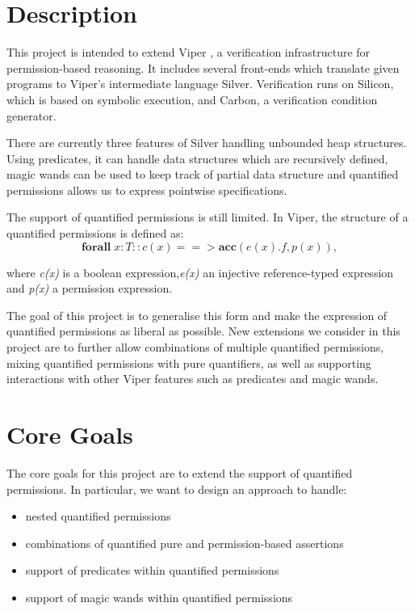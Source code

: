 \documentclass[12pt]{article}
\begin{document}
\maketitle

\section{Description}
This project is intended to extend Viper \cite{viper}, a verification infrastructure for permission-based reasoning. It includes several front-ends which translate given programs to Viper's intermediate language Silver. Verification runs on Silicon, which is based on symbolic execution, and Carbon, a verification condition generator.

There are currently three features of Silver handling unbounded heap structures. Using predicates, it can handle data structures which are recursively defined, magic wands \cite{magicwand} can be used to keep track of partial data structure and quantified permissions \cite{isc} allows us to express pointwise specifications. 

The support of quantified permissions is still limited. In Viper, the structure of a quantified permissions is defined as:
\newline 
\begin{equation}
	\mathbf{forall} \; x:T :: c(x) ==>\mathbf{acc}( e(x).f, p(x) ) ,
\end{equation}

where {\it c(x)} is  a boolean expression,{\it e(x)} an injective reference-typed expression and {\it p(x)} a permission expression.

The goal of this project is to generalise this form and make the expression of quantified permissions as liberal as possible. New extensions we consider in this project are to further allow combinations of multiple quantified permissions, mixing quantified permissions with pure quantifiers, as well as supporting interactions with other Viper features such as predicates and magic wands.

\section{Core Goals}
The core goals for this project are to extend the support of quantified permissions. In particular, we want to design an approach to handle: 
\begin{itemize}
\item nested quantified permissions
\item combinations of quantified pure and permission-based assertions
\item support of predicates within quantified permissions
\item support of magic wands within quantified permissions
\end{itemize}
\end{document}
